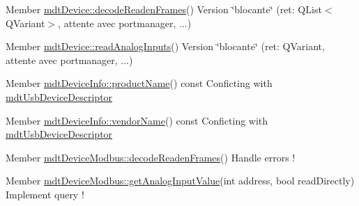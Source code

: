\label{todo__todo000003}
\hypertarget{todo__todo000003}{}
 
\begin{DoxyDescription}
\item[Member \hyperlink{classmdt_device_a0e43cc312b5b0685b07da8a49dd1ede6}{mdtDevice::decodeReadenFrames}() ]Version \char`\"{}blocante\char`\"{} (ret: QList$<$QVariant$>$, attente avec portmanager, ...) 
\end{DoxyDescription}

\label{todo__todo000002}
\hypertarget{todo__todo000002}{}
 
\begin{DoxyDescription}
\item[Member \hyperlink{classmdt_device_ac0023742214c29bdadd46383ae240972}{mdtDevice::readAnalogInputs}() ]Version \char`\"{}blocante\char`\"{} (ret: QVariant, attente avec portmanager, ...) 
\end{DoxyDescription}

\label{todo__todo000021}
\hypertarget{todo__todo000021}{}
 
\begin{DoxyDescription}
\item[Member \hyperlink{classmdt_device_info_afe4bbdc87acff59999905a0eeb812fe1}{mdtDeviceInfo::productName}() const  ]Conficting with \hyperlink{classmdt_usb_device_descriptor}{mdtUsbDeviceDescriptor} 
\end{DoxyDescription}

\label{todo__todo000020}
\hypertarget{todo__todo000020}{}
 
\begin{DoxyDescription}
\item[Member \hyperlink{classmdt_device_info_a207d7b6b49fd65726232e95cd9e0568c}{mdtDeviceInfo::vendorName}() const  ]Conficting with \hyperlink{classmdt_usb_device_descriptor}{mdtUsbDeviceDescriptor} 
\end{DoxyDescription}

\label{todo__todo000010}
\hypertarget{todo__todo000010}{}
 
\begin{DoxyDescription}
\item[Member \hyperlink{classmdt_device_modbus_ad2a43c428667654e71b288d0c44eca03}{mdtDeviceModbus::decodeReadenFrames}() ]Handle errors ! 
\end{DoxyDescription}

\label{todo__todo000004}
\hypertarget{todo__todo000004}{}
 
\begin{DoxyDescription}
\item[Member \hyperlink{classmdt_device_modbus_acf9a158bc7d9847858217e44394af07e}{mdtDeviceModbus::getAnalogInputValue}(int address, bool readDirectly) ]Implement query ! 
\end{DoxyDescription}


